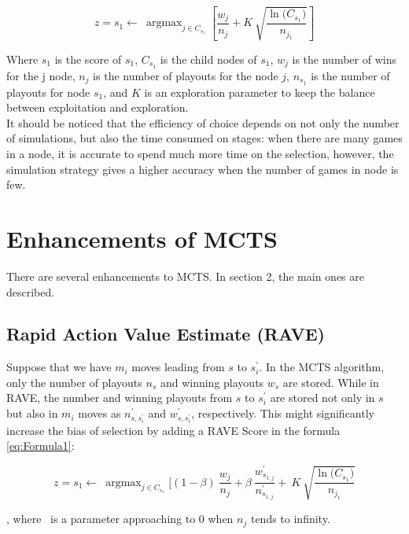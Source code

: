 \documentclass[paper=8.27in:11.69in]{scrartcl}
\DeclareMathOperator*{\argmax}{argmax}
\begin{document}
\begin{equation}
\label{eq:Formula1}
z = {s}_{1} \leftarrow \ \argmax_{j \in C_{s_{1}}} [\frac{{w}_{j}}{{n}_{j}} + K \ \sqrt{\frac{\ln({C_{s_{1}})}}{n_{j_{1}}}}]
\end{equation}

Where 
$ {s}_{1} $ is the score of $ {s}_{1} $, $ {C_{s_{1}}} $ is the child nodes of $ {s_{1}} $, $ {w_{j}} $ is the number of wins for the j node, $ {n_{j}} $ is the number of playouts for the node $ j $, $ {n_{s_{1}}} $ is the number of playouts for node $ {s_{1}} $, and $ K $ is an exploration parameter to keep the balance between exploitation and exploration.\\

It should be noticed that the efficiency of choice depends on not only the number of simulations, but also the time consumed on stages: when there are many games in a node, it is accurate to spend much more time on the selection, however, the simulation strategy gives a higher accuracy when the number of games in node is few. \cite{Kocsis06banditbased}\\
\section{Enhancements of MCTS}
There are several enhancements to MCTS. In section 2, the main ones are described.\\
\subsection{Rapid Action Value Estimate (RAVE)}
Suppose that we have $ {m}_{i} $ moves leading from $ s $ to $ {s}_{i}^{'} $. In the MCTS algorithm, only the number of playouts $ {n}_{s} $ and winning playouts $ {w}_{s} $ are stored. While in RAVE, the number and winning playouts from $ s $ to $ {s}_{i}^{'} $ are stored not only in $ s $ but also in  $ {m}_{i} $ moves as $ {n}^{'}_{s, s^{'}_i} $ and $ {w}^{'}_{s, s^{'}_i} $, respectively. This might significantly increase the bias of selection by adding a RAVE Score in the formula \ref{eq:Formula1}:

\begin{equation}
\label{eq:Formula2}
z = {s}_{1} \leftarrow \ \argmax_{j \in C_{s_{1}}} [(1 - \beta ) \ \frac{{w}_{j}}{{n}_{j}} + \beta \ {\frac{{w^{'}_{s_{1,j}}}}{n^{'}_{s_{1,j}}}} + \ K \ \sqrt{\frac{\ln({C_{s_{1}})}}{n_{j_{1}}}}
\end{equation}

,
where \beta \ is a parameter approaching to 0 when $ {n}_{j} $ tends to infinity.\\
\end{document}
